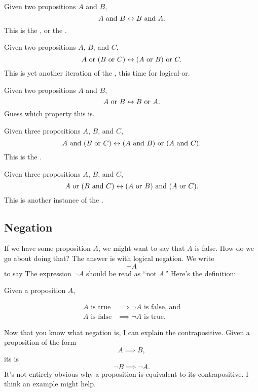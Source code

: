 \begin{lemma}
  \label{and-symmetry}
  Given two propositions $A$ and $B$, $$A \text{ and } B \leftrightarrow B \text{ and } A.$$
  This is the , or the .
\end{lemma}

\begin{lemma}
  \label{or-assoc}
  Given two propositions $A$, $B$, and $C$,
  $$A \text{ or } (B \text{ or } C) \leftrightarrow (A \text{ or } B) \text{ or } C.$$ This is yet another
  iteration of the , this time for
  logical-or.
\end{lemma}
\begin{lemma}
  \label{or-symmetry}
  Given two propositions $A$ and $B$, $$A \text{ or } B \leftrightarrow B \text{ or } A.$$
  Guess which property this is.
\end{lemma}

\begin{lemma}
  \label{and-or-dist}
  Given three propositions $A$, $B$, and $C$,
  $$A \text{ and } (B \text{ or } C) \leftrightarrow (A \text{ and } B) \text{ or } (A \text{ and } C).$$ This is
  the .
\end{lemma}

\begin{lemma}
  \label{or-and-dist}
  Given three propositions $A$, $B$, and $C$,
  $$A \text{ or } (B \text{ and } C) \leftrightarrow (A \text{ or } B) \text{ and } (A \text{ or } C).$$ This is
  another instance of the .
\end{lemma}

\subsection{Negation}

If we have some proposition $A$, we might want to say that $A$ is
false. How do we go about doing that? The answer is with logical
negation. We write $$\lnot A$$ to say  The
expression $\lnot A$ should be read as ``not $A$.'' Here's the
definition:

\begin{definition}
  Given a proposition $A$,

  \begin{align*}
    A \text{ is true} & \implies \lnot A \text{ is false, and} \\
    A \text{ is false} & \implies \lnot A \text{ is true.}
  \end{align*}
\end{definition}

Now that you know what negation is, I can explain the
contrapositive. Given a proposition of the form $$A \implies B,$$ its
 is $$\lnot B \implies \lnot A.$$ It's not
entirely obvious why a proposition is equivalent to its
contrapositive. I think an example might help.

